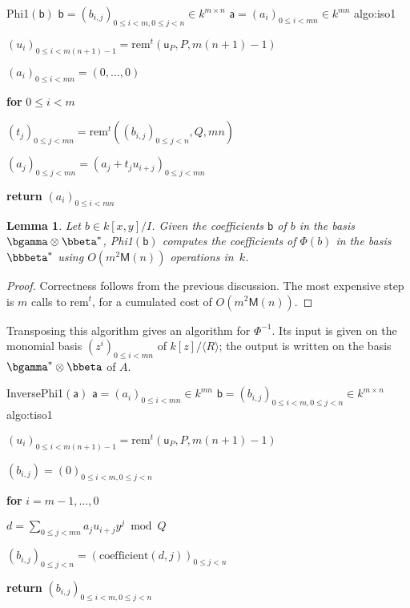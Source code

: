 \documentclass{sig-alternate}
\def\M {\ensuremath{\mathsf{M}}}
\def\va {\ensuremath{\mathsf{a}}}
\def\vu {\ensuremath{\mathsf{u}}}
\def\vb {\ensuremath{\mathsf{b}}}
\def\rem {\ensuremath{\mathrm{rem}}}
\def\coeff {\ensuremath{\mathrm{coefficient}}}
\newcounter{algo}
\newenvironment{algorithm_endline}[4]{\small\begin{center}\begin{minipage}{0.48\textwidth}
      \refstepcounter{algo}
      \label{#4}
      \sf
      \rule{\textwidth}{0.2pt}\\
      \makebox[\textwidth][c]{Algorithm~\arabic{algo}:~\textbf{#1}}\\
      \rule[0.5\baselineskip]{\textwidth}{0.2pt}\\

      \vspace{-12pt}

      \parbox{\textwidth}{\textbf{Input} #2}
      \parbox{\textwidth}{\textbf{Output} #3}

\vspace{-7pt}

      \begin{enumerate*}}{\end{enumerate*}
      \vspace{-11pt}
      \rule{\textwidth}{0.2pt}
\end{minipage}\end{center}
}
\newcommand{\ang}[1]{\langle#1\rangle}
\newtheorem{Lemma}{Lemma}
\begin{document}
\vspace{-10pt}

\begin{algorithm_endline}
{Phi1$(\vb)$}
{$\vb = (b_{i,j})_{0 \le i < m, 0 \le j < n} \in k^{m \times n}$}
{$\va = (a_{i})_{0 \le i < mn} \in k^{m n}$}
{algo:iso1}
\item $(u_i)_{0\le i < m(n+1)-1} = \rem^t(\vu_P,P,m(n+1)-1)$
\item  $(a_i)_{0\le i < mn} = (0,\dots,0)$
\item {\bf for} {$0\le i < m$}
\item \hspace{7mm} $(t_j)_{0\le j < mn} = \rem^t( (b_{i,j})_{0 \le j <n},Q,mn)$
\item \hspace{7mm} $(a_j)_{0\le j < mn} = (a_j + t_ju_{i+j})_{0\le j < mn}$
\item {\bf return} $(a_i)_{0\le i <mn}$
\end{algorithm_endline}

\begin{Lemma}
  Let $b \in k[x,y]/I$. Given the coefficients $\vb$ of $b$ in the
  basis $\bgamma \otimes \bbeta^\ast$, {\em Phi1}$(\vb)$ computes the
  coefficients of $\Phi(b)$ in the basis $\bbbeta^\ast$ using
  $O(m^2\M(n))$ operations in~$k$.
\end{Lemma}
\begin{proof}
  Correctness follows from the previous discussion. The most expensive
  step is $m$ calls to $\rem^t$, for a cumulated cost of
  $O(m^2\M(n))$.
\end{proof}

Transposing this algorithm gives an algorithm for $\Phi^{-1}$. Its
input is given on the monomial basis $(z^i)_{0 \le i < mn}$ of
$k[z]/\ang{R}$; the output is written on the basis $\bgamma^\ast
\otimes \bbeta$ of $A$.

\begin{algorithm_endline}
{InversePhi1$(\va)$}
{$\va = (a_{i})_{0 \le i < mn} \in k^{m n}$}
{$\vb = (b_{i,j})_{0 \le i < m, 0 \le j < n} \in k^{m \times n}$}
{algo:tiso1}
\item $(u_i)_{0\le i < m(n+1)-1} = \rem^t(\vu_P,P,m(n+1)-1)$
\item $(b_{i,j}) = (0)_{0\le i < m, 0 \le j < n}$
\item {\bf for} {$i = m-1,\dots,0$}
\item \hspace{7mm} $d=\sum_{0 \le j < mn} a_j u_{i+j} y^j \bmod Q$
\item \hspace{7mm}  $(b_{i,j})_{0 \le j < n} = (\coeff(d,j))_{0 \le j < n}$
\item {\bf return} $(b_{i,j})_{0 \le i < m, 0 \le j < n}$
\end{algorithm_endline}
\end{document}
